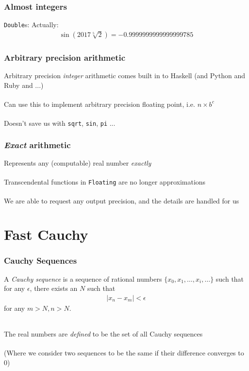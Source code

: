 \documentclass[11pt,aspectratio=169]{beamer}
\begin{document}
\begin{frame}
\frametitle{Almost integers}
\texttt{Double}s:
\pause
Actually:
\begin{align*}
\sin(2017 \sqrt[5]{2}) = -0.9999999999999999785
\end{align*}
\end{frame}

\begin{frame}
\frametitle{Arbitrary precision arithmetic}
Arbitrary precision \emph{integer} arithmetic comes built in to
Haskell (and Python and Ruby and ...)
\\~\\
Can use this to implement arbitrary precision floating point, i.e. $n
\times b^c$
\\~\\
Doesn't save us with \texttt{sqrt}, \texttt{sin}, \texttt{pi} ...
\end{frame}

\begin{frame}
\frametitle{\emph{Exact} arithmetic}
Represents any (computable) real number \emph{exactly}
\\~\\
Transcendental functions in \texttt{Floating} are no longer approximations
\\~\\
We are able to request any output precision, and the details are
handled for us
\end{frame}

\section{Fast Cauchy}

\begin{frame}
\frametitle{Cauchy Sequences}
\begin{definition}
A \emph{Cauchy sequence} is a sequence of rational numbers $\{x_0, x_1, \dots, x_i, \dots\}$
such that for any $\epsilon$, there exists an $N$ such that
\begin{align*}
\vert x_n - x_m \vert < \epsilon
\end{align*}
for any $m > N, n > N$.
\end{definition}
~\\
The real numbers are \emph{defined} to be the set of all Cauchy sequences
\\~\\
(Where we consider two sequences to be the same if their difference
converges to $0$)
\end{frame}
\end{document}

